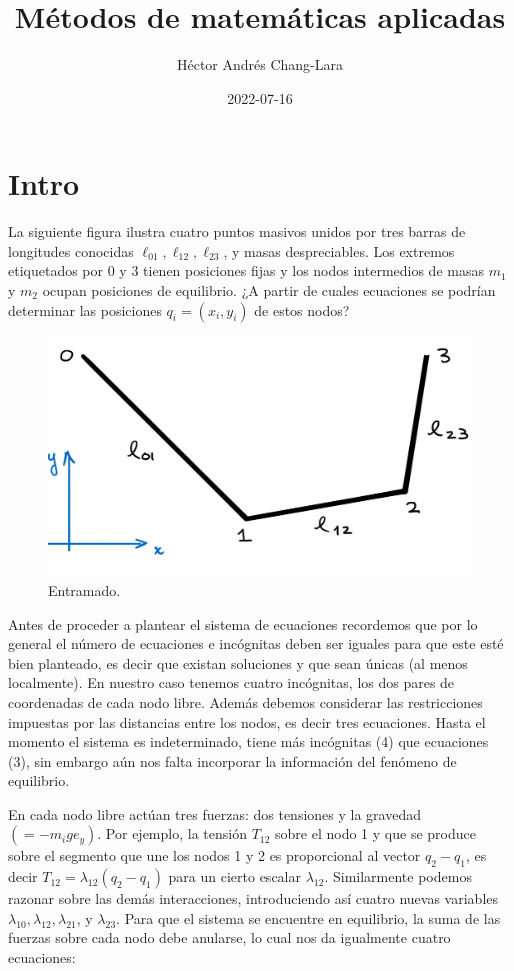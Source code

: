\documentclass[
]{book}
\title{Métodos de matemáticas aplicadas}
\author{Héctor Andrés Chang-Lara}
\date{2022-07-16}
\theoremstyle{definition}
\theoremstyle{definition}
\theoremstyle{definition}
\theoremstyle{definition}
\theoremstyle{remark}
\begin{document}
\maketitle

{
\setcounter{tocdepth}{1}
\tableofcontents
}
\hypertarget{intro}{%
\chapter{Intro}\label{intro}}

La siguiente figura ilustra cuatro puntos masivos unidos por tres barras de longitudes conocidas \(\ell_{01}, \ell_{12}, \ell_{23}\), y masas despreciables. Los extremos etiquetados por \(0\) y \(3\) tienen posiciones fijas y los nodos intermedios de masas \(m_1\) y \(m_2\) ocupan posiciones de equilibrio. ¿A partir de cuales ecuaciones se podrían determinar las posiciones \(q_i=(x_i,y_i)\) de estos nodos?

\begin{figure}

{\centering \includegraphics[width=0.5\linewidth]{./entramado} 

}

\caption{Entramado.}\label{fig:unnamed-chunk-1}
\end{figure}

Antes de proceder a plantear el sistema de ecuaciones recordemos que por lo general el número de ecuaciones e incógnitas deben ser iguales para que este esté bien planteado, es decir que existan soluciones y que sean únicas (al menos localmente). En nuestro caso tenemos cuatro incógnitas, los dos pares de coordenadas de cada nodo libre. Además debemos considerar las restricciones impuestas por las distancias entre los nodos, es decir tres ecuaciones. Hasta el momento el sistema es indeterminado, tiene más incógnitas (4) que ecuaciones (3), sin embargo aún nos falta incorporar la información del fenómeno de equilibrio.

En cada nodo libre actúan tres fuerzas: dos tensiones y la gravedad \((= -m_ige_y)\). Por ejemplo, la tensión \(T_{12}\) sobre el nodo 1 y que se produce sobre el segmento que une los nodos 1 y 2 es proporcional al vector \(q_2-q_1\), es decir \(T_{12} = \lambda_{12} (q_2-q_1)\) para un cierto escalar \(\lambda_{12}\). Similarmente podemos razonar sobre las demás interacciones, introduciendo así cuatro nuevas variables \(\lambda_{10}, \lambda_{12}, \lambda_{21}\), y \(\lambda_{23}\). Para que el sistema se encuentre en equilibrio, la suma de las fuerzas sobre cada nodo debe anularse, lo cual nos da igualmente cuatro ecuaciones:
\end{document}
